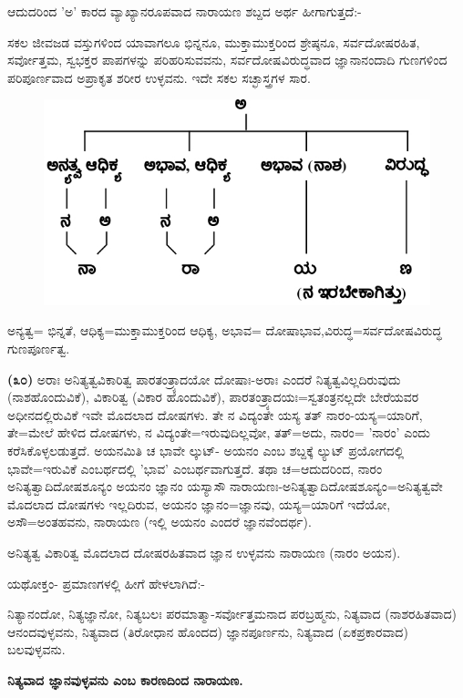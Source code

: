 ಆದುದರಿಂದ 'ಅ' ಕಾರದ ವ್ಯಾಖ್ಯಾನರೂಪವಾದ ನಾರಾಯಣ ಶಬ್ದದ ಅರ್ಥ ಹೀಗಾಗು\-ತ್ತದೆ:-

ಸಕಲ ಜೀವಜಡ ವಸ್ತುಗಳಿಂದ ಯಾವಾಗಲೂ ಭಿನ್ನನೂ, ಮುಕ್ತಾಮುಕ್ತರಿಂದ ಶ್ರೇಷ್ಠನೂ, ಸರ್ವದೋಷರಹಿತ, ಸರ್ವೋತ್ತಮ, ಸ್ವಭಕ್ತರ ಪಾಪಗಳನ್ನು ಪರಿಹರಿಸುವವನು, ಸರ್ವದೋಷವಿರುದ್ಧವಾದ ಜ್ಞಾನಾನಂದಾದಿ ಗುಣಗಳಿಂದ ಪರಿಪೂರ್ಣವಾದ ಅಪ್ರಾಕೃತ ಶರೀರ ಉಳ್ಳವನು. ಇದೇ ಸಕಲ ಸಚ್ಛಾಸ್ತ್ರಗಳ ಸಾರ.

\begin{figure}[!htbp]
\includegraphics[scale=.4]{images/fig1.jpg}
\end{figure}

ಅನ್ಯತ್ವ= ಭಿನ್ನತೆ, ಆಧಿಕ್ಯ=ಮುಕ್ತಾಮುಕ್ತರಿಂದ ಆಧಿಕ್ಯ, ಅಭಾವ= ದೋಷಾಭಾವ,\break ವಿರುದ್ಧ=ಸರ್ವದೋಷವಿರುದ್ಧ ಗುಣಪೂರ್ಣತ್ವ.

\textbf{(೩೦)} ಅರಾಃ ಅನಿತ್ಯತ್ವವಿಕಾರಿತ್ವ ಪಾರತಂತ್ರ್ಯಾದಯೋ ದೋಷಾಃ-ಅರಾಃ ಎಂದರೆ ನಿತ್ಯತ್ವವಿಲ್ಲದಿರುವುದು (ನಾಶಹೊಂದುವಿಕೆ), ವಿಕಾರಿತ್ವ (ವಿಕಾರ ಹೊಂದುವಿಕೆ), ಪಾರತಂತ್ರ್ಯಾ\-ದಯಃ=ಸ್ವತಂತ್ರನಲ್ಲದೇ ಬೇರೆಯವರ ಅಧೀನದಲ್ಲಿರುವಿಕೆ ಇವೇ ಮೊದಲಾದ ದೋಷಗಳು. ತೇ ನ ವಿದ್ಯಂತೇ ಯಸ್ಯ ತತ್ ನಾರಂ-ಯಸ್ಯ=ಯಾರಿಗೆ, ತೇ=ಮೇಲೆ ಹೇಳಿದ ದೋಷಗಳು, ನ ವಿದ್ಯಂತೇ=ಇರುವುದಿಲ್ಲವೋ, ತತ್=ಅದು, ನಾರಂ= 'ನಾರಂ' ಎಂದು ಕರೆಸಿಕೊಳ್ಳಲಡುತ್ತದೆ. ಅಯನಮಿತಿ ಚ ಭಾವೇ ಲ್ಕುಟ್- ಅಯನಂ ಎಂಬ ಶಬ್ದಕ್ಕೆ ಲ್ಯುಟ್ ಪ್ರಯೋಗದಲ್ಲಿ ಭಾವೇ=ಇರುವಿಕೆ ಎಂಬರ್ಥದಲ್ಲಿ 'ಭಾವ' ಎಂಬರ್ಥವಾಗುತ್ತದೆ. ತಥಾ ಚ=ಆದುದರಿಂದ, ನಾರಂ ಅನಿತ್ಯತ್ವಾದಿದೋಷಶೂನ್ಯಂ ಅಯನಂ ಜ್ಞಾನಂ ಯಸ್ಯಾಸೌ ನಾರಾಯಣಃ-ಅನಿತ್ಯತ್ವಾದಿದೋಷಶೂನ್ಯಂ=ಅನಿತ್ಯತ್ವವೇ ಮೊದಲಾದ ದೋಷಗಳು ಇಲ್ಲದಿರುವ, ಅಯನಂ ಜ್ಞಾನಂ=ಜ್ಞಾನವು, ಯಸ್ಯ=ಯಾರಿಗೆ ಇದೆಯೋ, ಅಸೌ=ಅಂತಹವನು, ನಾರಾಯಣ (ಇಲ್ಲಿ ಅಯನಂ ಎಂದರೆ ಜ್ಞಾನವೆಂದರ್ಥ).

ಅನಿತ್ಯತ್ವ ವಿಕಾರಿತ್ವ ಮೊದಲಾದ ದೋಷರಹಿತವಾದ ಜ್ಞಾನ ಉಳ್ಳವನು ನಾರಾಯಣ (ನಾರಂ ಅಯನ).

ಯಥೋಕ್ತಂ- ಪ್ರಮಾಣಗಳಲ್ಲಿ ಹೀಗೆ ಹೇಳಲಾಗಿದೆ:-

ನಿತ್ಯಾನಂದೋ, ನಿತ್ಯಜ್ಞಾನೋ, ನಿತ್ಯಬಲಃ ಪರಮಾತ್ಮಾ-ಸರ್ವೋತ್ತಮನಾದ ಪರಬ್ರಹ್ಮನು, ನಿತ್ಯವಾದ (ನಾಶರಹಿತವಾದ) ಆನಂದವುಳ್ಳವನು, ನಿತ್ಯವಾದ (ತಿರೋಧಾನ ಹೊಂದದ) ಜ್ಞಾನಪೂರ್ಣನು, ನಿತ್ಯವಾದ (ಏಕಪ್ರಕಾರವಾದ) ಬಲವುಳ್ಳವನು.

\begin{center}
\textbf{ನಿತ್ಯವಾದ ಜ್ಞಾನವುಳ್ಳವನು ಎಂಬ ಕಾರಣದಿಂದ ನಾರಾಯಣ.}
\end{center}

